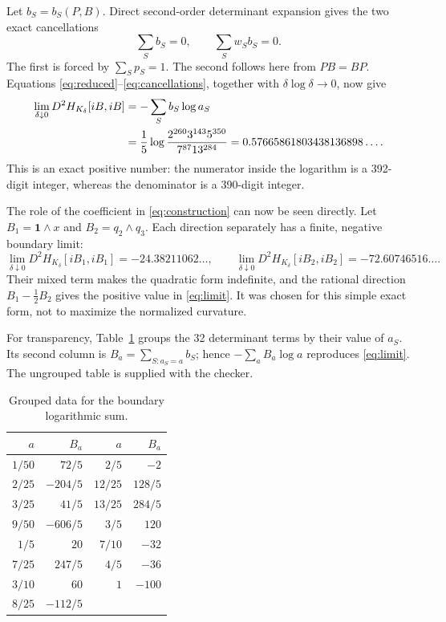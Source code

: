 \documentclass[11pt]{article}
\newcommand{\one}{\mathbf 1}
\begin{document}
Let \(b_S=b_S(P,B)\).  Direct second-order determinant expansion gives the two
exact cancellations
\begin{equation}\label{eq:cancellations}
 \sum_S b_S=0,
 \qquad
 \sum_S w_Sb_S=0.
\end{equation}
The first is forced by \(\sum_Sp_S=1\).  The second follows here from
\(PB=BP\).  Equations
\eqref{eq:reduced}--\eqref{eq:cancellations}, together with
\(\delta\log\delta\to0\), now give
\begin{align}
 \lim_{\delta\downarrow0}D^2H_{K_\delta}[iB,iB]
 &=-\sum_Sb_S\log a_S \notag\\
 &=\frac15\log
 \frac{2^{260}3^{143}5^{350}}{7^{87}13^{284}}
 =0.57665861803438136898\ldots.       \label{eq:limit}
\end{align}
This is an exact positive number: the numerator inside the logarithm is a
392-digit integer, whereas the denominator is a 390-digit integer.

The role of the coefficient in \eqref{eq:construction} can now be seen directly.
Let \(B_1=\one\wedge x\) and \(B_2=q_2\wedge q_3\).  Each direction separately
has a finite, negative boundary limit:
\[
 \lim_{\delta\downarrow0}D^2H_{K_\delta}[iB_1,iB_1]
 =-24.38211062\ldots,
 \qquad
 \lim_{\delta\downarrow0}D^2H_{K_\delta}[iB_2,iB_2]
 =-72.60746516\ldots.
\]
Their mixed term makes the quadratic form indefinite, and the rational direction
\(B_1-\tfrac12B_2\) gives the positive value in \eqref{eq:limit}.  It was chosen
for this simple exact form, not to maximize the normalized curvature.

For transparency, Table~\ref{tab:grouped} groups the 32 determinant terms by
their value of \(a_S\).  Its second column is
\(B_a=\sum_{S:a_S=a}b_S\); hence \(-\sum_aB_a\log a\) reproduces
\eqref{eq:limit}.  The ungrouped table is supplied with the checker.

\begin{table}[ht]
\centering
\small
\caption{Grouped data for the boundary logarithmic sum.}\label{tab:grouped}
\begin{tabular}{@{}rr@{\qquad}rr@{}}
\toprule
\(a\)&\(B_a\)&\(a\)&\(B_a\)\\
\midrule
\(1/50\)&\(72/5\)&\(2/5\)&\(-2\)\\
\(2/25\)&\(-204/5\)&\(12/25\)&\(128/5\)\\
\(3/25\)&\(41/5\)&\(13/25\)&\(284/5\)\\
\(9/50\)&\(-606/5\)&\(3/5\)&\(120\)\\
\(1/5\)&\(20\)&\(7/10\)&\(-32\)\\
\(7/25\)&\(247/5\)&\(4/5\)&\(-36\)\\
\(3/10\)&\(60\)&\(1\)&\(-100\)\\
\(8/25\)&\(-112/5\)&&\\
\bottomrule
\end{tabular}
\end{table}
\end{document}
